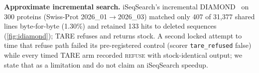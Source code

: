 \documentclass[letterpaper,twocolumn,10pt]{article}
\theoremstyle{definition}
\newcommand{\sys}{TARE\xspace}
\newcommand{\sys}{PARE\xspace}
\newcommand{\dec}[1]{\textsc{#1}}
\begin{document}
\textbf{Approximate incremental search.} iSeqSearch's incremental DIAMOND~\cite{yoo2025iseqsearch} on 300 proteins (Swiss\nobreakdash-Prot 2026\_01$\rightarrow$2026\_03) matched only 407 of 31{,}377 shared lines byte\nobreakdash-for\nobreakdash-byte (1.30\%) and retained 133 hits to deleted sequences (\cref{fig:idiamond}); \sys refuses and returns stock. A second locked attempt to time that refuse path failed its pre\nobreakdash-registered control (scorer \texttt{tare\_refused} false) while every timed \sys arm recorded \dec{refuse} with stock\nobreakdash-identical output; we state that as a limitation and do not claim an iSeqSearch speedup.
\end{document}
